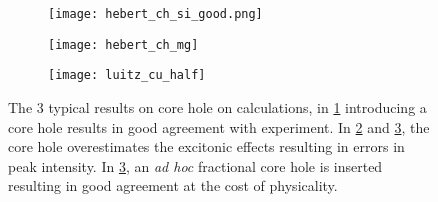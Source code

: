 \begin{figure}
	\begin{subfigure}{0.45\textwidth}
		\texttt{[image: hebert\_ch\_si\_good.png]} 
		\caption{}
		\label{hebert-ch-good}
	\end{subfigure}
    \hfill
	\begin{subfigure}{0.45\textwidth}
		\texttt{[image: hebert\_ch\_mg]} 
		\caption{}
		\label{hebert-ch-bad}
	\end{subfigure}
	\vspace{1cm}
	\begin{subfigure}{0.45\textwidth}
		\texttt{[image: luitz\_cu\_half]} 
		\caption{}
		\label{luitz_half}
	\end{subfigure}
	\centering
	\caption{The 3 typical results on core hole on calculations, in \ref{hebert-ch-good} introducing a core hole results in good agreement with experiment.  In \ref{hebert-ch-bad} and \ref{luitz_half}, the core hole overestimates the excitonic effects resulting in errors in peak intensity.  In \ref{luitz_half}, an \textit{ad hoc} fractional core hole is inserted resulting in good agreement at the cost of physicality.}
	\label{core-hole-types}
	
\end{figure}

\newpage




